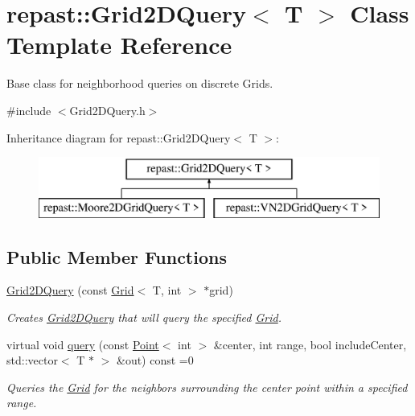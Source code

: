 \hypertarget{classrepast_1_1_grid2_d_query}{\section{repast\-:\-:Grid2\-D\-Query$<$ T $>$ Class Template Reference}
\label{classrepast_1_1_grid2_d_query}
}


Base class for neighborhood queries on discrete Grids.  




{\ttfamily \#include $<$Grid2\-D\-Query.\-h$>$}

Inheritance diagram for repast\-:\-:Grid2\-D\-Query$<$ T $>$\-:\begin{figure}[H]
\begin{center}
\leavevmode
\includegraphics[height=2.000000cm]{classrepast_1_1_grid2_d_query}
\end{center}
\end{figure}
\subsection*{Public Member Functions}
\begin{DoxyCompactItemize}
\item 
\hypertarget{classrepast_1_1_grid2_d_query_a53b52f9a510b9ca3b2a98de26761ab00}{\hyperlink{classrepast_1_1_grid2_d_query_a53b52f9a510b9ca3b2a98de26761ab00}{Grid2\-D\-Query} (const \hyperlink{classrepast_1_1_grid}{Grid}$<$ T, int $>$ $\ast$grid)}\label{classrepast_1_1_grid2_d_query_a53b52f9a510b9ca3b2a98de26761ab00}

\begin{DoxyCompactList}\small\item\em Creates \hyperlink{classrepast_1_1_grid2_d_query}{Grid2\-D\-Query} that will query the specified \hyperlink{classrepast_1_1_grid}{Grid}. \end{DoxyCompactList}\item 
virtual void \hyperlink{classrepast_1_1_grid2_d_query_a44d46360d72ba9e7b0114c2cb248ee96}{query} (const \hyperlink{classrepast_1_1_point}{Point}$<$ int $>$ \&center, int range, bool include\-Center, std\-::vector$<$ T $\ast$ $>$ \&out) const =0
\begin{DoxyCompactList}\small\item\em Queries the \hyperlink{classrepast_1_1_grid}{Grid} for the neighbors surrounding the center point within a specified range. \end{DoxyCompactList}\end{DoxyCompactItemize}
